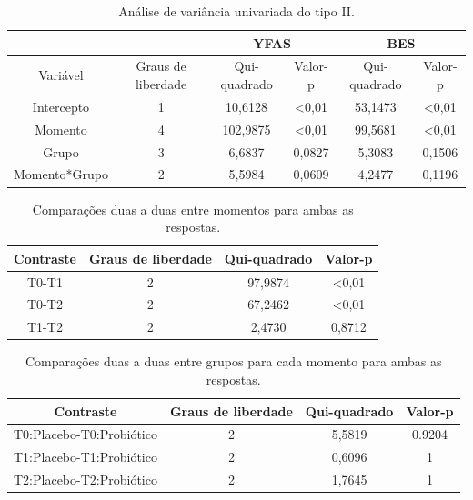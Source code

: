 \documentclass[AMA,STIX1COL]{WileyNJD-v2}
\begin{document}
\begin{table}[H]
\centering
\begin{tabular}{c|c|cc|cc}
\hline
              &                    & \multicolumn{2}{c|}{YFAS}     & \multicolumn{2}{c}{BES}       \\ \hline
Variável      & Graus de liberdade & Qui-quadrado & Valor-p        & Qui-quadrado & Valor-p        \\ \hline
Intercepto    & 1                  & 10,6128      & \textless 0,01 & 53,1473      & \textless 0,01 \\
Momento       & 4                  & 102,9875     & \textless 0,01 & 99,5681      & \textless 0,01 \\
Grupo         & 3                  & 6,6837       & 0,0827         & 5,3083       & 0,1506         \\
Momento*Grupo & 2                  & 5,5984       & 0,0609         & 4,2477       & 0,1196         \\ \hline
\end{tabular}
\caption{Análise de variância univariada do tipo II.}
\label{tab5}
\end{table}

\begin{table}[H]
\centering
\begin{tabular}{cccc}
\hline
Contraste & Graus de liberdade & Qui-quadrado & Valor-p        \\ \hline
T0-T1     & 2                  & 97,9874      & \textless 0,01 \\
T0-T2     & 2                  & 67,2462      & \textless 0,01 \\
T1-T2     & 2                  & 2,4730       & 0,8712         \\ \hline
\end{tabular}
\caption{Comparações duas a duas entre momentos para ambas as respostas.}
\label{tab6}
\end{table}

\begin{table}[H]
\centering
\begin{tabular}{cccc}
\hline
Contraste                & Graus de liberdade & Qui-quadrado & Valor-p \\ \hline
T0:Placebo-T0:Probiótico & 2                  & 5,5819       & 0.9204  \\
T1:Placebo-T1:Probiótico & 2                  & 0,6096       & 1       \\
T2:Placebo-T2:Probiótico & 2                  & 1,7645       & 1       \\ \hline
\end{tabular}
\caption{Comparações duas a duas entre grupos para cada momento para ambas as respostas.}
\label{tab7}
\end{table}
\end{document}
